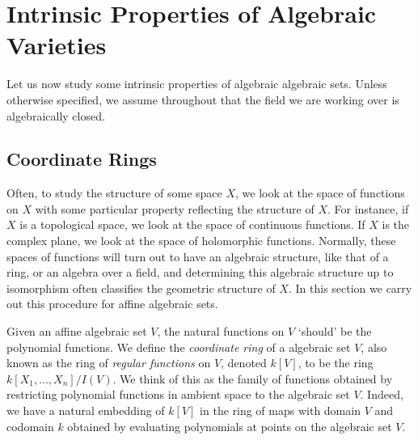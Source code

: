 \chapter{Intrinsic Properties of Algebraic Varieties}

Let us now study some intrinsic properties of algebraic algebraic sets. Unless otherwise specified, we assume throughout that the field we are working over is algebraically closed.

\section{Coordinate Rings}

Often, to study the structure of some space $X$, we look at the space of functions on $X$ with some particular property reflecting the structure of $X$. For instance, if $X$ is a topological space, we look at the space of continuous functions. If $X$ is the complex plane, we look at the space of holomorphic functions. Normally, these spaces of functions will turn out to have an algebraic structure, like that of a ring, or an algebra over a field, and determining this algebraic structure up to isomorphism often classifies the geometric structure of $X$. In this section we carry out this procedure for affine algebraic sets.

Given an affine algebraic set $V$, the natural functions on $V$ `should' be the polynomial functions. We define the \emph{coordinate ring} of a algebraic set $V$, also known as the ring of \emph{regular functions} on $V$, denoted $k[V]$, to be the ring $k[X_1,\dots,X_n]/I(V)$. We think of this as the family of functions obtained by restricting polynomial functions in ambient space to the algebraic set $V$. Indeed, we have a natural embedding of $k[V]$ in the ring of maps with domain $V$ and codomain $k$ obtained by evaluating polynomials at points on the algebraic set $V$.

